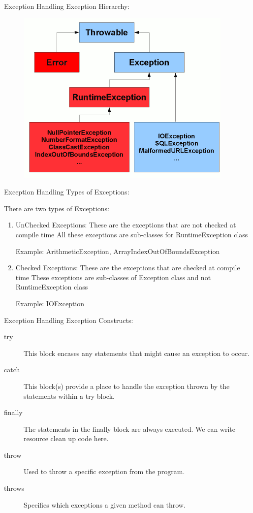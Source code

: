 \documentclass[14pt]{beamer}
\begin{document}
\begin{frame}{Exception Handling}
 Exception Hierarchy:
 \begin{figure}[H]
  \begin{center}
 \includegraphics[scale=.8]{exception-heirarchy.png}  
  \end{center}

 \end{figure}
\end{frame}

\begin{frame}{Exception Handling}
 Types of Exceptions:
 
 There are two types of Exceptions:
\begin{enumerate}
 \item UnChecked Exceptions:
       These are the exceptions that are not checked at compile time
       All these exceptions are sub-classes for RuntimeException class
       
       Example: ArithmeticException, ArrayIndexOutOfBoundsException

\item Checked Exceptions:
      These are the exceptions that are checked at compile time
      These exceptions are sub-classes of Exception class and not RuntimeException class
      
      Example: IOException
\end{enumerate}
\end{frame}

\begin{frame}{Exception Handling}
 Exception Constructs:
 
 \begin{description}
  \item [try] This block encases any statements that might cause an exception to occur.
  \item [catch] This block(s)  provide a place to handle the exception thrown by the statements within a try block.
  \item [finally] The statements in the finally block are always executed. We can write resource clean up code here.
  \item [throw] Used to throw a specific exception from the program.
  \item [throws] Specifies which exceptions a given method can throw.
 \end{description}
\end{frame}
\end{document}
